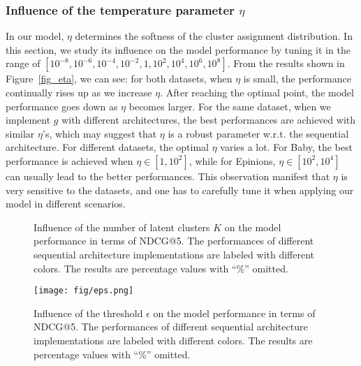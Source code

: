 \documentclass[conference]{IEEEtran}
\theoremstyle{definition}
\theoremstyle{theorem}
\theoremstyle{proof}
\theoremstyle{remark}
\begin{document}
\subsubsection{Influence of the temperature parameter $\eta$}
In our model, $\eta$ determines the softness of the cluster assignment distribution.
In this section, we study its influence on the model performance by tuning it in the range of $[10^{-8},10^{-6},10^{-4},10^{-2},1,10^{2},10^{4},10^{6},10^{8}]$.
From the results shown in Figure~\ref{fig_eta}, we can see:
for both datasets, when $\eta$ is small, the performance continually rises up as we increase $\eta$.
After reaching the optimal point, the model performance goes down as $\eta$ becomes larger.
For the same dataset, when we implement $g$ with different architectures, the best performances are achieved with similar $\eta$'s, which may suggest that $\eta$ is a robust parameter w.r.t. the sequential architecture.
For different datasets, the optimal $\eta$ varies a lot.
For Baby, the best performance is achieved when $\eta\in [1,10^{2}]$, while for Epinions, $\eta\in [10^{2}, 10^{4}]$ can usually lead to the better performances.
This observation manifest that $\eta$ is very sensitive to the datasets, and one has to carefully tune it when applying our model in different scenarios.


\begin{figure}[t]
	\centering
	\setlength{\fboxrule}{0.pt}
	\setlength{\fboxsep}{0.pt}
	\vspace{-0.1cm}
	\caption{{Influence of the number of latent clusters $K$ on the model performance in terms of NDCG@5.
	The performances of different sequential architecture implementations are labeled with different colors.
	{The results are percentage values with ``\%'' omitted.}
	}}
	\label{fig_k}
	\vspace{-0.1cm}
\end{figure}


\begin{figure}[t]
	\centering
	\setlength{\fboxrule}{0.pt}
	\setlength{\fboxsep}{0.pt}
	\texttt{[image: fig/eps.png]}
	\vspace{-0.1cm}
	\caption{{Influence of the threshold $\epsilon$ on the model performance in terms of NDCG@5.
	The performances of different sequential architecture implementations are labeled with different colors.
	{The results are percentage values with ``\%'' omitted.}
	}}
	\label{fig_epsilon}
	\vspace{-0.cm}
\end{figure}
\end{document}
